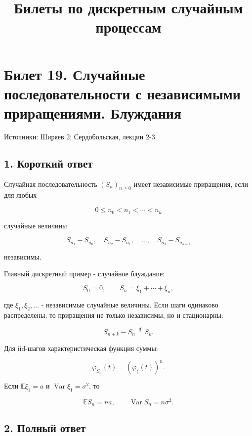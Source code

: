 \documentclass[
  11pt,
  a4paper,
]{article}
\title{Билеты по дискретным случайным процессам}
\author{}
\date{}
\begin{document}
\maketitle

\section{Билет 19. Случайные последовательности с независимыми
приращениями.
Блуждания}\label{ux431ux438ux43bux435ux442-19.-ux441ux43bux443ux447ux430ux439ux43dux44bux435-ux43fux43eux441ux43bux435ux434ux43eux432ux430ux442ux435ux43bux44cux43dux43eux441ux442ux438-ux441-ux43dux435ux437ux430ux432ux438ux441ux438ux43cux44bux43cux438-ux43fux440ux438ux440ux430ux449ux435ux43dux438ux44fux43cux438.-ux431ux43bux443ux436ux434ux430ux43dux438ux44f}

Источники: Ширяев 2; Сердобольская, лекции 2-3.

\subsection{1. Короткий
ответ}\label{ux43aux43eux440ux43eux442ux43aux438ux439-ux43eux442ux432ux435ux442}

Случайная последовательность \((S_n)_{n\ge0}\) имеет независимые
приращения, если для любых

\[
0\le n_0<n_1<\cdots<n_k
\]

случайные величины

\[
S_{n_1}-S_{n_0},\quad S_{n_2}-S_{n_1},\quad\ldots,\quad S_{n_k}-S_{n_{k-1}}
\]

независимы.

Главный дискретный пример - случайное блуждание:

\[
S_0=0,
\qquad
S_n=\xi_1+\cdots+\xi_n,
\]

где \(\xi_1,\xi_2,\ldots\) - независимые случайные величины. Если шаги
одинаково распределены, то приращения не только независимы, но и
стационарны:

\[
S_{n+k}-S_n\stackrel d=S_k.
\]

Для iid-шагов характеристическая функция суммы:

\[
\varphi_{S_n}(t)=\left(\varphi_\xi(t)\right)^n.
\]

Если \(\mathbb E\xi_1=a\) и \(\operatorname{Var}\xi_1=\sigma^2\), то

\[
\mathbb ES_n=na,
\qquad
\operatorname{Var}S_n=n\sigma^2.
\]

\subsection{2. Полный
ответ}\label{ux43fux43eux43bux43dux44bux439-ux43eux442ux432ux435ux442}
\end{document}
